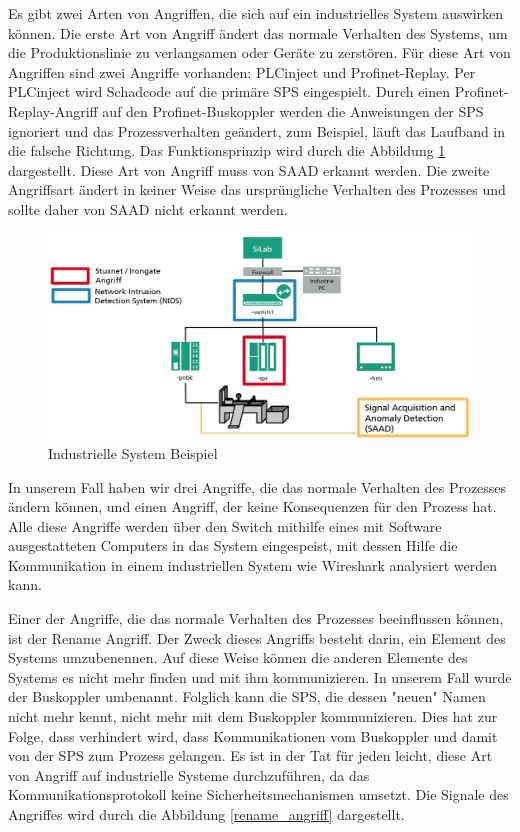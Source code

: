 \documentclass[12pt,a4paper]{scrartcl}
\numberwithin{equation}{section}
\begin{document}
Es gibt zwei Arten von Angriffen, die sich auf ein industrielles System auswirken können. Die erste Art von Angriff ändert das normale Verhalten des Systems, um die Produktionslinie zu verlangsamen oder Geräte zu zerstören. Für diese Art von Angriffen sind zwei Angriffe vorhanden: PLCinject und Profinet-Replay. Per PLCinject wird Schadcode auf die primäre SPS eingespielt. Durch einen Profinet-Replay-Angriff auf den Profinet-Buskoppler werden die Anweisungen der SPS ignoriert und das Prozessverhalten geändert, zum Beispiel, läuft das Laufband  in die falsche Richtung. Das Funktionsprinzip wird durch die Abbildung \ref{ganze_systeme} dargestellt. Diese Art von Angriff muss von SAAD erkannt werden. Die zweite Angriffsart ändert in keiner Weise das ursprüngliche Verhalten des Prozesses und sollte daher von SAAD nicht erkannt werden. \\

\begin{figure}[ht!]
	\centering
	  \includegraphics[scale=0.5]{ganze_systeme.jpg}
	  \caption{Industrielle System Beispiel}
	\label{ganze_systeme}
\end{figure}


In unserem Fall haben wir drei Angriffe, die das normale Verhalten des Prozesses ändern können, und einen Angriff, der keine Konsequenzen für den Prozess hat. Alle diese Angriffe werden über den Switch mithilfe eines mit Software ausgestatteten Computers in das System eingespeist, mit dessen Hilfe die Kommunikation in einem industriellen System wie Wireshark analysiert werden kann.

Einer der Angriffe, die das normale Verhalten des Prozesses beeinflussen können, ist der Rename Angriff. Der Zweck dieses Angriffs besteht darin, ein Element des Systems umzubenennen. Auf diese Weise können die anderen Elemente des Systems es nicht mehr finden und mit ihm kommunizieren. In unserem Fall wurde der Buskoppler umbenannt. Folglich kann die SPS, die dessen "neuen" Namen nicht mehr kennt, nicht mehr mit dem Buskoppler kommunizieren. Dies hat zur Folge, dass verhindert wird, dass Kommunikationen vom Buskoppler und damit von der SPS zum Prozess gelangen. Es ist in der Tat für jeden leicht, diese Art von Angriff auf industrielle Systeme durchzuführen, da das Kommunikationsprotokoll keine Sicherheitsmechanismen umsetzt. Die Signale des Angriffes wird durch die Abbildung \ref{rename_angriff} dargestellt.
\end{document}
